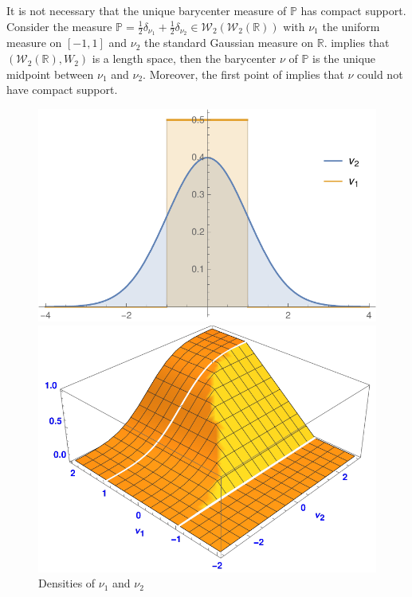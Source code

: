 \begin{rmk}
	It is not necessary that the unique barycenter measure of $\mathbb{P}$ has compact support.
	Consider the measure $\mathbb{P}=
		\frac{1}{2}\delta_{\nu_1} + \frac{1}{2}\delta_{\nu_2}
		\in \mathcal{W}_2(\mathcal{W}_2(\mathbb{R}))$
	with $\nu_1$ the uniform measure on $[-1,1]$ and $\nu_2$ the standard Gaussian measure on $\mathbb{R}$.
	 implies that $(\mathcal{W}_2(\mathbb{R}), W_2)$
	is a length space,
	then the barycenter $\nu$ of $\mathbb{P}$ is the unique midpoint between $\nu_1$ and $\nu_2$.
	Moreover, the first point of 
	implies that $\nu$ could not have compact support.
	\begin{figure}[ht]
		\centering
		\begin{minipage}{.49\textwidth}
			\centering
			\includegraphics[height=.5\linewidth]{Chapters/OPT_line.pdf}
			\caption{Densities of $\nu_1$ and $\nu_2$}
		\end{minipage}
		\begin{minipage}{.49\textwidth}
			\centering
			\includegraphics[height=.5\linewidth]{Chapters/cdf_line.pdf}

\end{minipage}
\end{figure}
\end{rmk}
